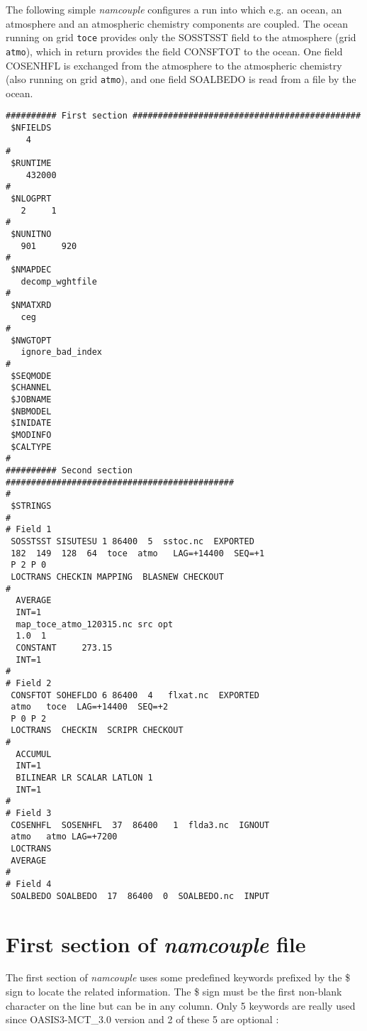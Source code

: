 The following simple {\it namcouple} configures a run into which e.g. an
ocean, an atmosphere and an atmospheric chemistry components are
coupled. The ocean running on grid {\tt toce} provides only the SOSSTSST field to the atmosphere (grid {\tt atmo}),
which in return provides the field CONSFTOT to the ocean. One field
COSENHFL is exchanged from the atmosphere to the atmospheric
chemistry (also running on grid {\tt atmo}), and one field SOALBEDO is read from a file by the ocean.

\begin{verbatim}
########## First section #############################################
 $NFIELDS
    4  
#
 $RUNTIME
    432000
#
 $NLOGPRT
   2     1
#
 $NUNITNO
   901     920
#
 $NMAPDEC
   decomp_wghtfile
#
 $NMATXRD
   ceg
#
 $NWGTOPT
   ignore_bad_index
#
 $SEQMODE
 $CHANNEL
 $JOBNAME
 $NBMODEL
 $INIDATE
 $MODINFO
 $CALTYPE
#
########## Second section #############################################
#
 $STRINGS
#
# Field 1
 SOSSTSST SISUTESU 1 86400  5  sstoc.nc  EXPORTED
 182  149  128  64  toce  atmo   LAG=+14400  SEQ=+1
 P 2 P 0
 LOCTRANS CHECKIN MAPPING  BLASNEW CHECKOUT 
#
  AVERAGE 
  INT=1
  map_toce_atmo_120315.nc src opt
  1.0  1
  CONSTANT     273.15 
  INT=1
#
# Field 2
 CONSFTOT SOHEFLDO 6 86400  4   flxat.nc  EXPORTED
 atmo   toce  LAG=+14400  SEQ=+2
 P 0 P 2
 LOCTRANS  CHECKIN  SCRIPR CHECKOUT
#
  ACCUMUL 
  INT=1
  BILINEAR LR SCALAR LATLON 1
  INT=1
#
# Field 3
 COSENHFL  SOSENHFL  37  86400   1  flda3.nc  IGNOUT 
 atmo   atmo LAG=+7200 
 LOCTRANS
 AVERAGE
#
# Field 4
 SOALBEDO SOALBEDO  17  86400  0  SOALBEDO.nc  INPUT
\end{verbatim}


\section{ First section of {\it namcouple} file}
\label{subsec_namcouplefirst}

The first section of {\it namcouple } uses some predefined keywords
prefixed by the \$ sign to locate the related information. The \$ sign
must be the first non-blank character on the line but can be in any column.
Only 5 keywords are really used since OASIS3-MCT\_3.0 version and 2 of these 5 are optional :


